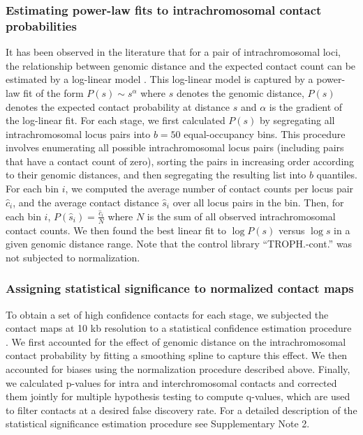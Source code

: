 \subsubsection*{Estimating power-law fits to intrachromosomal contact probabilities}
\label{met:power-law}
It has been observed in the literature that for a pair of intrachromosomal loci,
the relationship between genomic distance and the expected contact count can be
estimated by a log-linear model \citep{lieberman-aiden:comprehensive, fudenberg:higher-order}.
This log-linear model is captured by a power-law fit of the form $P(s) \sim s^\alpha$
where $s$ denotes the genomic distance, $P(s)$ denotes the expected contact
probability at distance $s$ and $\alpha$ is the gradient of the log-linear fit.
For each stage, we first calculated $P(s)$ by segregating all intrachromosomal locus
pairs into $b=50$ equal-occupancy bins. This procedure involves enumerating all
possible intrachromosomal locus pairs (including pairs that have a contact count of zero),
sorting the pairs in increasing order according to their genomic distances, and then
segregating the resulting list into $b$ quantiles. For each bin $i$, we computed the
average number of contact counts per locus pair $\hat{c}_i$, and the average contact
distance $\hat{s}_i$ over all locus pairs in the bin. Then, for each bin $i$,
$P(\hat{s}_i)= \frac{\hat{c}_i}{N}$ where $N$ is the sum of all observed intrachromosomal
contact counts. We then found the best linear fit to $\log P(s)$ versus $\log s$ in
a given genomic distance range. Note that the control library  ``TROPH.-cont.''
was not subjected to normalization.


\subsubsection*{Assigning statistical significance to normalized contact maps}
\label{met:fithic}
To obtain a set of high confidence contacts for each stage, we subjected the contact
maps at 10 kb resolution to a statistical confidence estimation procedure
\citep{ay:statistical}. We first accounted for the effect of genomic distance on the
intrachromosomal contact probability by fitting a smoothing spline to capture this
effect. We then accounted for biases using the normalization procedure described
above. Finally, we calculated p-values for intra and interchromosomal contacts and
corrected them jointly for multiple hypothesis testing to compute q-values, which
are used to filter contacts at a desired false discovery rate. For a detailed
description of the statistical significance estimation procedure see Supplementary Note 2.

